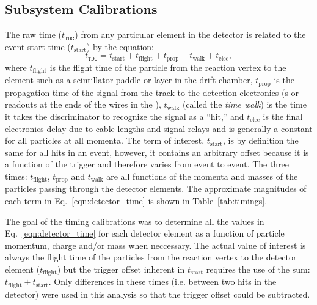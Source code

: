 \subsection{\label{sec:data.calib.systems}Subsystem Calibrations}

The raw  time ($t_\mathtt{TDC}$) from any particular element in the detector is related to the event start time ($t_\mathrm{start}$) by the equation:
\begin{equation}
    t_\mathtt{TDC} = t_\mathrm{start} + t_\mathrm{flight} + t_\mathrm{prop} + t_\mathrm{walk} + t_\mathrm{elec},
    \label{eqn:detector_time}
\end{equation}
where $t_\mathrm{flight}$ is the flight time of the particle from the reaction vertex to the element such as a scintillator paddle or layer in the drift chamber, $t_\mathrm{prop}$ is the propagation time of the signal from the track to the detection electronics (s or readouts at the ends of the wires in the ), $t_\mathrm{walk}$ (called the \emph{time walk}) is the time it takes the discriminator to recognize the signal as a ``hit,'' and $t_\mathrm{elec}$ is the final electronics delay due to cable lengths and signal relays and is generally a constant for all particles at all momenta. The term of interest, $t_\mathrm{start}$, is by definition the same for all hits in an event, however, it contains an arbitrary offset because it is a function of the trigger and therefore varies from event to event. The three times: $t_\mathrm{flight}$, $t_\mathrm{prop}$ and $t_\mathrm{walk}$ are all functions of the momenta and masses of the particles passing through the detector elements. The approximate magnitudes of each term in Eq.~\ref{eqn:detector_time} is shown in Table~\ref{tab:timings}.


The goal of the timing calibrations was to determine all the values in Eq.~\ref{eqn:detector_time} for each detector element as a function of particle momentum, charge and/or mass when neccessary. The actual value of interest is always the flight time of the particles from the reaction vertex to the detector element ($t_\mathrm{flight}$) but the trigger offset inherent in $t_\mathrm{start}$ requires the use of the sum: $t_\mathrm{flight} + t_\mathrm{start}$. Only differences in these times (i.e. between two hits in the detector) were used in this analysis so that the trigger offset could be subtracted.

